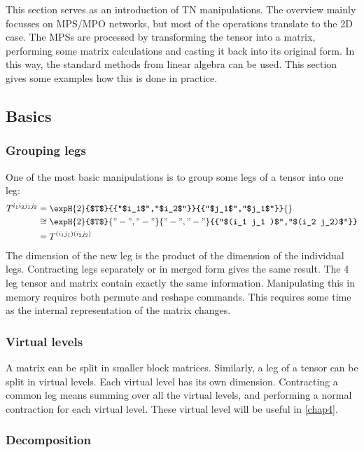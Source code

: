 This section serves as an introduction of \Gls{TN} manipulations. The overview mainly focusses on \Gls{MPS}/\Gls{MPO} networks, but most of the operations translate to the 2D case.
The \Glspl{MPS} are processed by transforming the tensor into a matrix, performing some matrix calculations and casting it back into its original form. In this way, the standard methods from linear algebra can be used. This section gives some examples how this is done in practice.

\subsection{Basics}

\subsubsection{Grouping legs}
One of the most basic manipulations is to group some legs of a tensor into one leg:
\begin{equation}
    \begin{split}
        T^{i_1 i_2 j_1 j_2} &=  \expH{2}{$T$}{{"$i_1$","$i_2$"}}{{"$j_1$","$j_1$"}}{} \\
        & \cong \expH{2}{$T$}{{"-","-"}}{{"-","-"}}{{"$(i_1 j_1 )$","$(i_2 j_2)$"}} \\
        &= T^{ (i_1 j_1 ) (i_2 j_2) } \\
    \end{split}
\end{equation}
The dimension of the new leg is the product of the dimension of the individual legs. Contracting legs separately or in merged form gives the same result. The 4 leg tensor and matrix contain exactly the same information. Manipulating this in memory requires both permute and reshape commands. This requires some time as the internal representation of the matrix changes.

\subsubsection{Virtual levels}
A matrix can be split in smaller block matrices. Similarly, a leg of a tensor can be split in virtual levels. Each virtual level has its own dimension. Contracting a common leg means summing over all the virtual levels, and performing a normal contraction for each virtual level. These virtual level will be useful in \cref{chap4}.

\subsubsection{Decomposition} \label{decompMPO}
\def \figone {\expH{2}{$O^{u v,v w}$}{{"$i_1$","$i_2$"}}{{"$j_1$","$j_1$"}}{{"u","w"}}}

